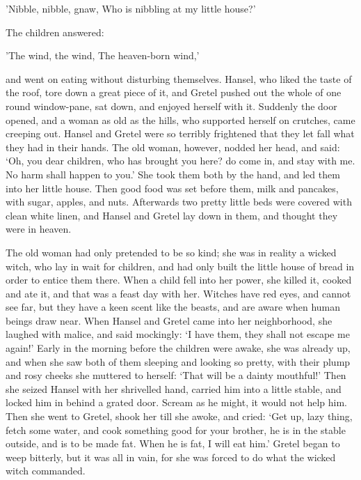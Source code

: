 \documentclass[oneside,11pt]{memoir} %
\begin{document}
'Nibble, nibble, gnaw,
Who is nibbling at my little house?'

The children answered:

'The wind, the wind,
The heaven-born wind,'

and went on eating without disturbing themselves. Hansel, who liked the taste of the roof, tore down a great piece of it, and Gretel pushed out the whole of one round window-pane, sat down, and enjoyed herself with it. Suddenly the door opened, and a woman as old as the hills, who supported herself on crutches, came creeping out. Hansel and Gretel were so terribly frightened that they let fall what they had in their hands. The old woman, however, nodded her head, and said: `Oh, you dear children, who has brought you here? do come in, and stay with me. No harm shall happen to you.' She took them both by the hand, and led them into her little house. Then good food was set before them, milk and pancakes, with sugar, apples, and nuts. Afterwards two pretty little beds were covered with clean white linen, and Hansel and Gretel lay down in them, and thought they were in heaven.

The old woman had only pretended to be so kind; she was in reality a wicked witch, who lay in wait for children, and had only built the little house of bread in order to entice them there. When a child fell into her power, she killed it, cooked and ate it, and that was a feast day with her. Witches have red eyes, and cannot see far, but they have a keen scent like the beasts, and are aware when human beings draw near. When Hansel and Gretel came into her neighborhood, she laughed with
malice, and said mockingly: `I have them, they shall not escape me again!' Early in the morning before the children were awake, she was already up, and when she saw both of them sleeping and looking so pretty, with their plump and rosy cheeks she muttered to herself: `That will be a dainty mouthful!' Then she seized Hansel with her shrivelled hand, carried him into a little stable, and locked him in behind a grated door. Scream as he might, it would not help him. Then she went to
Gretel, shook her till she awoke, and cried: `Get up, lazy thing, fetch some water, and cook something good for your brother, he is in the stable outside, and is to be made fat. When he is fat, I will eat him.' Gretel began to weep bitterly, but it was all in vain, for she was forced to do what the wicked witch commanded.
\end{document}
